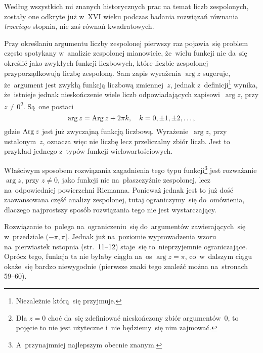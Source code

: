 \documentclass[a4paper,11pt]{article}
\begin{document}
\vspace{\spaceFour}


\start {} Według wszystkich mi znanych historycznych prac na
temat liczb zespolonych, zostały one odkryte już w~XVI wieku podczas
badania rozwiązań równania \emph{trzeciego} stopnia, nie zaś równań
kwadratowych. 

\vspace{\spaceFour}


\start {} Przy określaniu argumentu liczby zespolonej pierwszy
raz pojawia~się problem często spotykany w~analizie zespolonej
mianowicie, że~wielu funkcji nie da~się określić jako zwykłych funkcji
liczbowych, które liczbie zespolonej przyporządkowują liczbę
zespoloną. Sam zapis wyrażenia $\arg z$ sugeruje, że~argument jest
zwykłą funkcją liczbową zmiennej~$z$, jednak
z~definicji\footnote{Niezależnie którą~się przyjmuje.} wynika,
że~istnieje jednak nieskończenie wiele liczb odpowiadających
zapisowi~$\arg z$, przy $z \neq 0$\footnote{Dla $z = 0$ choć da~się
  zdefiniować nieskończony zbiór argumentów~0, to pojęcie to nie jest
  użyteczne i~nie będziemy~się nim zajmować.}. Są~one postaci
\begin{equation}
  \label{eq:Leja-06}
  \arg z = \textrm{Arg}\: z + 2\pi k, \quad k = 0, \pm 1, \pm 2,\ldots,
\end{equation}
gdzie $\textrm{Arg}\: z$ jest już zwyczajną funkcją liczbową.
Wyrażenie~$\arg z$, przy ustalonym~$z$, oznacza więc nie liczbę lecz
przeliczalny zbiór liczb. Jest to przykład jednego z~typów funkcji
wielowartościowych.

Właściwym sposobem rozwiązania zagadnienia tego typu
funkcji\footnote{A~przynajmniej najlepszym obecnie znanym.} jest
rozważanie $\arg z$, przy $z \neq 0$, jako funkcji nie na~płaszczyźnie
zespolonej, lecz na~odpowiedniej powierzchni Riemanna. Ponieważ jednak
jest to już dość zaawansowana część analizy zespolonej, tutaj
ograniczymy~się do~omówienia, dlaczego najprostszy sposób rozwiązania
tego nie jest wystarczający.

Rozwiązanie to~polega na~ograniczeniu~się do~argumentów
zawierających~się w~przedziale $( -\pi, \pi ]$. Jednak już na~poziomie
wyprowadzenia wzoru na~pierwiastek n\dywiz stopnia (str.~11--12)
staje~się to~nieprzyjemnie ograniczające. Oprócz tego, funkcja ta nie
byłaby ciągła na~os $\arg z = \pi$, co~w~dalszym ciągu okaże~się
bardzo niewygodnie (pierwsze znaki tego znaleźć można na~stronach
59--60).

\vspace{\spaceFour}
\end{document}

